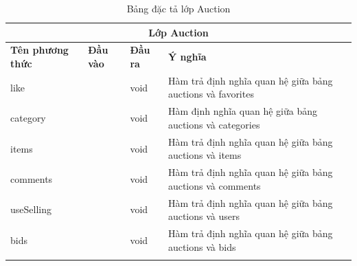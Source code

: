 \documentclass{article}
\begin{document}
    \begin{longtable}{| p{} | p{} | p{} | p{} |} 
    \hline
        \multicolumn{4}{|c|}{Lớp Auction}\\\hline
        \bfseries Tên phương thức & \bfseries Đầu vào & \bfseries Đầu ra & \bfseries Ý nghĩa  \\\hline
        like & & void & Hàm trả định nghĩa quan hệ giữa bảng auctions và favorites\\\hline
        category & & void & Hàm định nghĩa quan hệ giữa bảng auctions và categories\\\hline
        items & & void & Hàm trả định nghĩa quan hệ giữa bảng auctions và items\\\hline
        comments & & void & Hàm trả định nghĩa quan hệ giữa bảng auctions và comments\\\hline
        useSelling & & void & Hàm trả định nghĩa quan hệ giữa bảng auctions và users\\\hline
        bids & & void & Hàm trả định nghĩa quan hệ giữa bảng auctions và bids\\\hline
    \caption{Bảng đặc tả lớp Auction}
    \label{bang46}
    \end{longtable}
\end{document}

